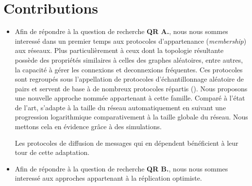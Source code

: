 
\section{Contributions}

\begin{itemize}
\item Afin de répondre à la question de recherche \textbf{QR A.}, nous nous
  sommes interessé dans un premier temps aux protocoles d'appartenance
  (\emph{membership}) aux réseaux. Plus particulièrement à ceux dont la
  topologie résultante possède des propriétés similaires à celles des graphes
  aléatoires, entre autres, la capacité à gérer les connexions et deconnexions
  fréquentes. Ces protocoles sont regroupés sous l'appellation de protocoles
  d'échantillonnage aléatoire de pairs et servent de base à de nombreux
  protocoles répartis (\REF). Nous proposons une nouvelle approche nommée \SPRAY
  appartenant à cette famille. Comparé à l'état de l'art, \SPRAY s'adapte à la
  taille du réseau automatiquement en suivant une progression logarithmique
  comparativement à la taille globale du réseau. Nous mettons cela en évidence
  grâce à des simulations.

  Les protocoles de diffusion de messages qui en dépendent bénéficient à leur
  tour de cette adaptation. 


\item Afin de répondre à la question de recherche \textbf{QR B.}, nous nous
  sommes interessé aux approches appartenant à la réplication optimiste. 
\end{itemize}

